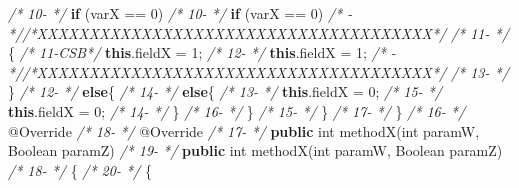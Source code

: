 \documentclass[
]{article}
\newenvironment{Shaded}{\begin{snugshade}}{\end{snugshade}}
\newcommand{\AttributeTok}[1]{\textcolor[rgb]{0.77,0.63,0.00}{#1}}
\newcommand{\BuiltInTok}[1]{#1}
\newcommand{\CommentTok}[1]{\textcolor[rgb]{0.56,0.35,0.01}{\textit{#1}}}
\newcommand{\DataTypeTok}[1]{\textcolor[rgb]{0.13,0.29,0.53}{#1}}
\newcommand{\DecValTok}[1]{\textcolor[rgb]{0.00,0.00,0.81}{#1}}
\newcommand{\FunctionTok}[1]{\textcolor[rgb]{0.00,0.00,0.00}{#1}}
\newcommand{\KeywordTok}[1]{\textcolor[rgb]{0.13,0.29,0.53}{\textbf{#1}}}
\newcommand{\NormalTok}[1]{#1}
\begin{document}
\begin{Shaded}
\begin{Highlighting}[]
\CommentTok{/* 10-   */}        \KeywordTok{if}\NormalTok{ (varX == }\DecValTok{0}\NormalTok{)                                   }\CommentTok{/* 10-   */}        \KeywordTok{if}\NormalTok{ (varX == }\DecValTok{0}\NormalTok{)                                   }
\CommentTok{/*   -   *//*XXXXXXXXXXXXXXXXXXXXXXXXXXXXXXXXXXXXXX*/}               \CommentTok{/* 11-   */}\NormalTok{        \{                                                }
\CommentTok{/* 11-CSB*/}            \KeywordTok{this}\NormalTok{.}\FunctionTok{fieldX}\NormalTok{ = }\DecValTok{1}\NormalTok{;                             }\CommentTok{/* 12-   */}            \KeywordTok{this}\NormalTok{.}\FunctionTok{fieldX}\NormalTok{ = }\DecValTok{1}\NormalTok{;                             }
\CommentTok{/*   -   *//*XXXXXXXXXXXXXXXXXXXXXXXXXXXXXXXXXXXXXX*/}               \CommentTok{/* 13-   */}\NormalTok{        \}                                                            }
\CommentTok{/* 12-   */}        \KeywordTok{else}\NormalTok{\{                                            }\CommentTok{/* 14-   */}        \KeywordTok{else}\NormalTok{\{                                            }
\CommentTok{/* 13-   */}            \KeywordTok{this}\NormalTok{.}\FunctionTok{fieldX}\NormalTok{ = }\DecValTok{0}\NormalTok{;                             }\CommentTok{/* 15-   */}            \KeywordTok{this}\NormalTok{.}\FunctionTok{fieldX}\NormalTok{ = }\DecValTok{0}\NormalTok{;                             }
\CommentTok{/* 14-   */}\NormalTok{     \}                                                        }\CommentTok{/* 16-   */}\NormalTok{        \}                                                        }
\CommentTok{/* 15-   */}\NormalTok{    \}                                                    }\CommentTok{/* 17-   */}\NormalTok{    \}                                                    }
\CommentTok{/* 16-   */}    \AttributeTok{@Override}                                            \CommentTok{/* 18-   */}    \AttributeTok{@Override}                                            
\CommentTok{/* 17-   */}    \KeywordTok{public} \DataTypeTok{int} \FunctionTok{methodX}\NormalTok{(}\DataTypeTok{int}\NormalTok{ paramW, }\BuiltInTok{Boolean}\NormalTok{ paramZ)       }\CommentTok{/* 19-   */}    \KeywordTok{public} \DataTypeTok{int} \FunctionTok{methodX}\NormalTok{(}\DataTypeTok{int}\NormalTok{ paramW, }\BuiltInTok{Boolean}\NormalTok{ paramZ)       }
\CommentTok{/* 18-   */}\NormalTok{    \{                                                    }\CommentTok{/* 20-   */}\NormalTok{    \{                                                    }

\end{Highlighting}
\end{Shaded}
\end{document}
